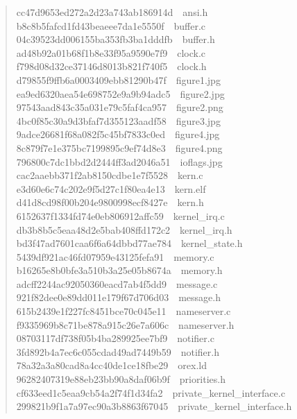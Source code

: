 \documentclass[letterpaper]{article}
\begin{document}
\begin{quote}
{cc47d9653ed272a2d23a743ab186914d~~ansi.h\\
b8c8b5fafcd1fd43beaeee7da1e5550f~~buffer.c\\
04c39523dd006155ba353fb3ba1dddfb~~buffer.h\\
ad48b92a01b68f1b8e33f95a9590e7f9~~clock.c\\
f798d08d32ce37146d8013b821f740f5~~clock.h\\
d79855f9ffb6a0003409ebb81290b47f~~figure1.jpg\\
ea9ed6320aea54e698752e9a9b94adc5~~figure2.jpg\\
97543aad843c35a031e79c5faf4ca957~~figure2.png\\
4bc0f85c30a9d3bfaf7d355123aadf58~~figure3.jpg\\
9adce26681f68a082f5c45bf7833c0ed~~figure4.jpg\\
8c879f7e1e375bc7199895c9ef74d8e3~~figure4.png\\
796800c7dc1bbd2d2444ff3ad2046a51~~ioflags.jpg\\
cac2aaebb371f2ab8150cdbe1e7f5528~~kern.c\\
e3d60e6c74c202e9f5d27c1f80ea4e13~~kern.elf\\
d41d8cd98f00b204e9800998ecf8427e~~kern.h\\
6152637f1334fd74e0eb806912affc59~~kernel\_irq.c\\
db3b8b5c5eaa48d2e5bab408ffd172c2~~kernel\_irq.h\\
bd3f47ad7601caa6f6a64dbbd77ae784~~kernel\_state.h\\
5439df921ac46fd07959e43125fefa91~~memory.c\\
b16265e8b0bfe3a510b3a25e05b8674a~~memory.h\\
adcff2244ac92050360eacd7ab4f5dd9~~message.c\\
921f82dee0e89dd011e179f67d706d03~~message.h\\
615b2439e1f227fc8451bce70c045e11~~nameserver.c\\
f9335969b8c71be878a915c26e7a606c~~nameserver.h\\
08703117df738f05b4ba289925ee7bf9~~notifier.c\\
3fd892b4a7ec6c055cdad49ad7449b59~~notifier.h\\
78a32a3a80cad8a4cc40de1ce18fbe29~~orex.ld\\
96282407319e88eb23bb90a8daf06b9f~~priorities.h\\
cf633eed1c5eaa9cb54a2f74f1d34fa2~~private\_kernel\_interface.c\\
299821b9f1a7a97ec90a3b8863f67045~~private\_kernel\_interface.h\\
}
\end{quote}
\end{document}
